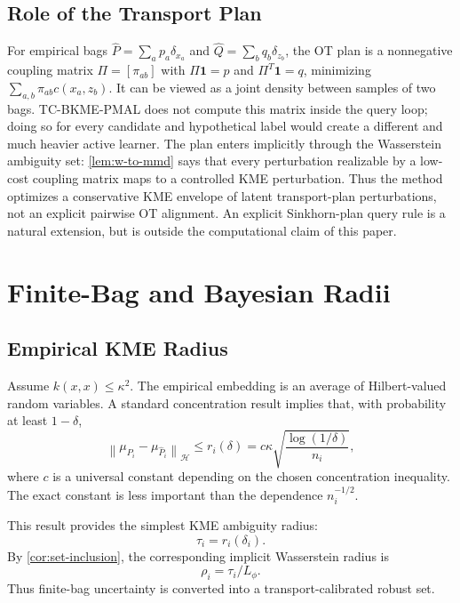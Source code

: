 \documentclass[10pt,journal]{IEEEtran}
\newcommand{\Hcal}{\mathcal{H}}
\newcommand{\wh}{\widehat}
\newcommand{\norm}[1]{\left\lVert #1 \right\rVert}
\newcommand{\one}{\mathbf{1}}
\begin{document}
\subsection{Role of the Transport Plan}
\label{subsec:transport-plan}

For empirical bags $\wh P=\sum_a p_a\delta_{x_a}$ and $\wh Q=\sum_b q_b\delta_{z_b}$, the OT plan is a nonnegative coupling matrix $\Pi=[\pi_{ab}]$ with $\Pi\one=p$ and $\Pi^T\one=q$, minimizing $\sum_{a,b}\pi_{ab}c(x_a,z_b)$. It can be viewed as a joint density between samples of two bags. TC-BKME-PMAL does not compute this matrix inside the query loop; doing so for every candidate and hypothetical label would create a different and much heavier active learner. The plan enters implicitly through the Wasserstein ambiguity set: \cref{lem:w-to-mmd} says that every perturbation realizable by a low-cost coupling matrix maps to a controlled KME perturbation. Thus the method optimizes a conservative KME envelope of latent transport-plan perturbations, not an explicit pairwise OT alignment. An explicit Sinkhorn-plan query rule is a natural extension, but is outside the computational claim of this paper.

\section{Finite-Bag and Bayesian Radii}
\label{sec:radii}

\subsection{Empirical KME Radius}

Assume $k(x,x)\le \kappa^2$. The empirical embedding is an average of Hilbert-valued random variables. A standard concentration result implies that, with probability at least $1-\delta$,
\begin{equation}
\label{eq:kme-concentration}
    \norm{\mu_{P_i}-\mu_{\wh P_i}}_{\Hcal}\le r_i(\delta)
    = c\kappa\sqrt{\frac{\log(1/\delta)}{n_i}},
\end{equation}
where $c$ is a universal constant depending on the chosen concentration inequality. The exact constant is less important than the dependence $n_i^{-1/2}$.

This result provides the simplest KME ambiguity radius:
\begin{equation}
    \tau_i=r_i(\delta_i).
\end{equation}
By \cref{cor:set-inclusion}, the corresponding implicit Wasserstein radius is
\begin{equation}
    \rho_i=\tau_i/L_\phi.
\end{equation}
Thus finite-bag uncertainty is converted into a transport-calibrated robust set.
\end{document}
